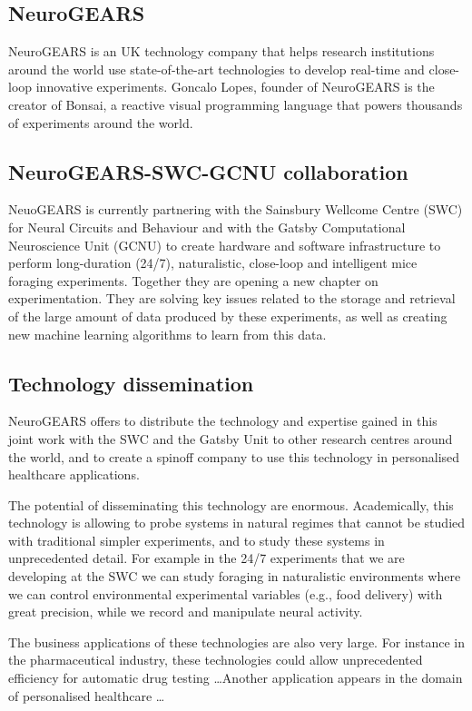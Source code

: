 \subsection{NeuroGEARS}

NeuroGEARS is an UK technology company that helps research institutions around the
world use state-of-the-art technologies to develop real-time and close-loop
innovative experiments. Goncalo Lopes, founder of NeuroGEARS is the creator of Bonsai, a
reactive visual programming language that powers thousands of experiments
around the world.

\subsection{NeuroGEARS-SWC-GCNU collaboration}

NeuoGEARS is currently partnering with the Sainsbury Wellcome Centre (SWC) for
Neural Circuits and Behaviour and with the Gatsby Computational Neuroscience
Unit (GCNU) to create hardware and software infrastructure to perform
long-duration (24/7), naturalistic, close-loop and intelligent mice foraging
experiments. Together they are opening a new chapter on experimentation. They
are solving key issues related to the storage and retrieval of the large amount
of data produced by these experiments, as well as creating new machine learning
algorithms to learn from this data.

\subsection{Technology dissemination}

NeuroGEARS offers to distribute the technology and expertise gained in this
joint work with the SWC and the Gatsby Unit to other research centres around
the world, and to create a spinoff company to use this technology in
personalised healthcare applications.

The potential of disseminating this technology are enormous. Academically,
this technology is allowing to probe systems in natural regimes that cannot
be studied with traditional simpler experiments, and to study these systems in
unprecedented detail. For example in the 24/7 experiments that we
are developing at the SWC we can study foraging in naturalistic environments
where we can control environmental experimental variables (e.g., food delivery)
with great precision, while we record and manipulate neural activity.

The business applications of these technologies are also very large. For
instance in the pharmaceutical industry, these technologies could allow
unprecedented efficiency for automatic drug testing \ldots Another application
appears in the domain of personalised healthcare \ldots


